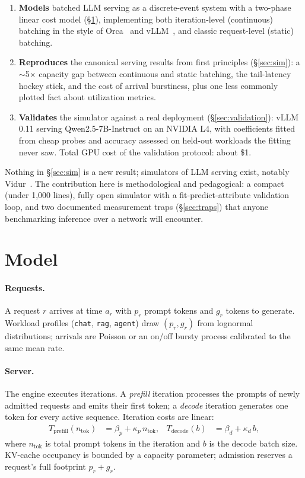 \documentclass[11pt]{article}
\begin{document}
\begin{enumerate}
  \item \textbf{Models} batched LLM serving as a discrete-event system with a two-phase linear cost model (\S\ref{sec:model}), implementing both iteration-level (continuous) batching in the style of Orca~\cite{orca} and vLLM~\cite{vllm}, and classic request-level (static) batching.
  \item \textbf{Reproduces} the canonical serving results from first principles (\S\ref{sec:sim}): a $\sim$5$\times$ capacity gap between continuous and static batching, the tail-latency hockey stick, and the cost of arrival burstiness, plus one less commonly plotted fact about utilization metrics.
  \item \textbf{Validates} the simulator against a real deployment (\S\ref{sec:validation}): vLLM 0.11 serving Qwen2.5-7B-Instruct on an NVIDIA L4, with coefficients fitted from cheap probes and accuracy assessed on held-out workloads the fitting never saw. Total GPU cost of the validation protocol: about \$1.
\end{enumerate}

Nothing in \S\ref{sec:sim} is a new result; simulators of LLM serving exist, notably Vidur~\cite{vidur}. The contribution here is methodological and pedagogical: a compact (under 1{,}000 lines), fully open simulator with a fit-predict-attribute validation loop, and two documented measurement traps (\S\ref{sec:traps}) that anyone benchmarking inference over a network will encounter.

\section{Model}\label{sec:model}

\paragraph{Requests.} A request $r$ arrives at time $a_r$ with $p_r$ prompt tokens and $g_r$ tokens to generate. Workload profiles (\texttt{chat}, \texttt{rag}, \texttt{agent}) draw $(p_r, g_r)$ from lognormal distributions; arrivals are Poisson or an on/off bursty process calibrated to the same mean rate.

\paragraph{Server.} The engine executes iterations. A \emph{prefill} iteration processes the prompts of newly admitted requests and emits their first token; a \emph{decode} iteration generates one token for every active sequence. Iteration costs are linear:
\begin{align}
T_{\text{prefill}}(n_{\text{tok}}) &= \beta_p + \kappa_p \, n_{\text{tok}}, &
T_{\text{decode}}(b) &= \beta_d + \kappa_d \, b,
\end{align}
where $n_{\text{tok}}$ is total prompt tokens in the iteration and $b$ is the decode batch size. KV-cache occupancy is bounded by a capacity parameter; admission reserves a request's full footprint $p_r + g_r$.
\end{document}
